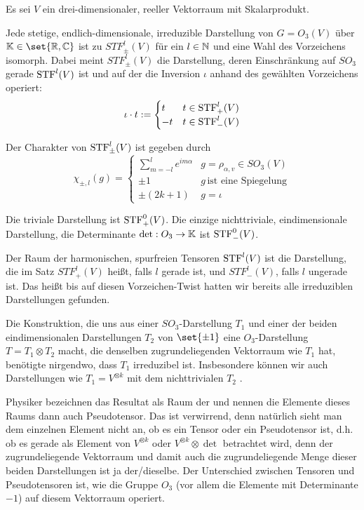 \begin{corollary}
Es sei $V$ ein drei-dimensionaler, reeller Vektorraum mit Skalarprodukt.

Jede stetige, endlich-dimensionale, irreduzible Darstellung von $G=O_3(V)$ über $\IK\in\set{\IR,\IC}$ ist zu $STF_{\pm}^l(V)$ für ein $l\in\mathbb{N}$ und eine Wahl des Vorzeichens isomorph. Dabei meint $STF_{\pm}^l(V)$ die Darstellung, deren Einschränkung auf $SO_3$ gerade $\operatorname{STF}^l(V)$ ist und auf der die Inversion $\iota$ anhand des gewählten Vorzeichens operiert:
\[\iota \cdot t := \begin{cases}
t & t\in \operatorname{STF}_+^l(V) \\
-t & t\in \operatorname{STF}_-^l(V)
\end{cases}\]

Der Charakter von $\operatorname{STF}_{\pm}^l(V)$ ist gegeben durch
\[\chi_{\pm,l}(g) = \begin{cases}
\sum_{m=-l}^l e^{im\alpha} & g=\rho_{\alpha,v}\in SO_3(V) \\
\pm 1 & g\,\text{ist eine Spiegelung} \\
\pm (2k+1) & g=\iota
\end{cases}\]
\end{corollary}

\begin{remark}
Die triviale Darstellung ist $\operatorname{STF}_+^0(V)$. Die einzige nichttriviale, eindimensionale Darstellung, die Determinante $\det: O_3 \to \mathbb{K}$ ist $\operatorname{STF}_-^0(V)$.

Der Raum der harmonischen, spurfreien Tensoren $\operatorname{STF}^l(V)$ ist die Darstellung, die im Satz $STF_+^l(V)$ heißt, falls $l$ gerade ist, und $STF_-^l(V)$, falls $l$ ungerade ist. Das heißt bis auf diesen Vorzeichen-Twist hatten wir bereits alle irreduziblen Darstellungen gefunden.
\end{remark}

\begin{remark}
Die Konstruktion, die uns aus einer $SO_3$-Darstellung $T_1$ und einer der beiden eindimensionalen Darstellungen $T_2$ von $\set{\pm 1}$ eine $O_3$-Darstellung $T=T_1\otimes T_2$ macht, die denselben zugrundeliegenden Vektorraum wie $T_1$ hat, benötigte nirgendwo, dass $T_1$ irreduzibel ist. Insbesondere können wir auch Darstellungen wie $T_1=V^{\otimes k}$ mit dem nichttrivialen $T_2$ .

Physiker bezeichnen das Resultat als Raum der  und nennen die Elemente dieses Raums dann auch Pseudotensor. Das ist verwirrend, denn natürlich sieht man dem einzelnen Element nicht an, ob es ein Tensor oder ein Pseudotensor ist, d.h. ob es gerade als Element von $V^{\otimes k}$ oder $V^{\otimes k}\otimes\det$ betrachtet wird, denn der zugrundeliegende Vektorraum und damit auch die zugrundeliegende Menge dieser beiden Darstellungen ist ja der/dieselbe. Der Unterschied zwischen Tensoren und Pseudotensoren ist, wie die Gruppe $O_3$ (vor allem die Elemente mit Determinante $-1$) auf diesem Vektorraum operiert.
\end{remark}